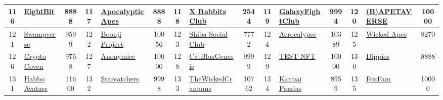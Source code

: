 \begin{table*}[]
{\begin{tabular}{|c|l|c|c|l|c|c|l|c|c|l|c|c|l|c|}
        116   & \href{https://eightbit.me}{EightBit}                                               & 8888              & 117   & \href{https://apocalypticapes.com/}{Apocalyptic Apes}                                             & 8888              & 118   & \href{http://xrabbits.club}{X Rabbits Club}                                       & 2544              & 119   & \href{https://galaxyfightclub.com/}{GalaxyFightClub}                          & 9994              & 120   & \href{https://bapetaverse.com/}{(B)APETAVERSE}                                            & 10000                                   \\ \hline
        121   & \href{http://swamps.io}{Swampverse}                                                & 9599              & 122   & \href{https://boonjiproject.com}{Boonji Project}                                                  & 10056             & 123   & \href{http://shibasocialclub.com}{Shiba Social Club}                              & 7772              & 124   & \href{http://www.acrocalypse.gg}{Acrocalypse}                                 & 10389             & 125   & \href{https://wickedboneclub.com}{Wicked Apes}                                            & 8270                                    \\ \hline
        126   & \href{https://www.cryptocoven.xyz/}{Crypto Coven}                                  & 9768              & 127   & \href{https://www.anonymice.com}{Anonymice}                                                       & 10000             & 128   & \href{https://www.catblox.xyz}{CatBloxGenesis}                                    & 9999              & 129   & \href{http://remilio.org}{TEST NFT}                                           & 10000             & 130   & \href{https://www.dippies.io/}{Dippies}                                                   & 8888                                    \\ \hline
        131   & \href{https://nft.habbo.com/}{Habbo Avatars}                                       & 11600             & 132   & \href{https://www.starcatchers.io/}{Starcatchers}                                                 & 9998              & 133   & \href{https://www.wickedcranium.com/}{TheWickedCraniums}                          & 10762             & 134   & \href{https://kanpaipandas.io/}{Kanpai Pandas}                                & 8959              & 135   & \href{http://foxfam.io}{FoxFam}                                                           & 10000                                   \\ \hline

\end{tabular}}
\end{table*}

